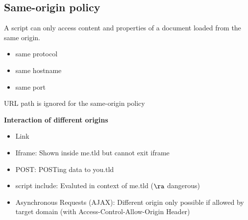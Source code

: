 \documentclass[fs, footer]{latex4ei}
\begin{document}
\begin{multicols*}{4}
{\subsection{Same-origin policy}
A script can only access content and properties of a document loaded from the same origin.
\begin{itemize}
  \item same protocol
  \item same hostname
  \item same port
\end{itemize}
URL path is ignored for the same-origin policy

\textbf{Interaction of different origins}
\begin{itemize}
  \item Link
  \item Iframe: Shown inside me.tld but cannot exit iframe
  \item POST: POSTing data to you.tld
  \item script include: Evaluted in context of me.tld ($\ra$ dangerous)
  \item Asynchronous Requests (AJAX): Different origin only possible if allowed by target domain (with Access-Control-Allow-Origin Header)
\end{itemize}
}   \sectionbox{
}
\end{multicols*}
\end{document}
